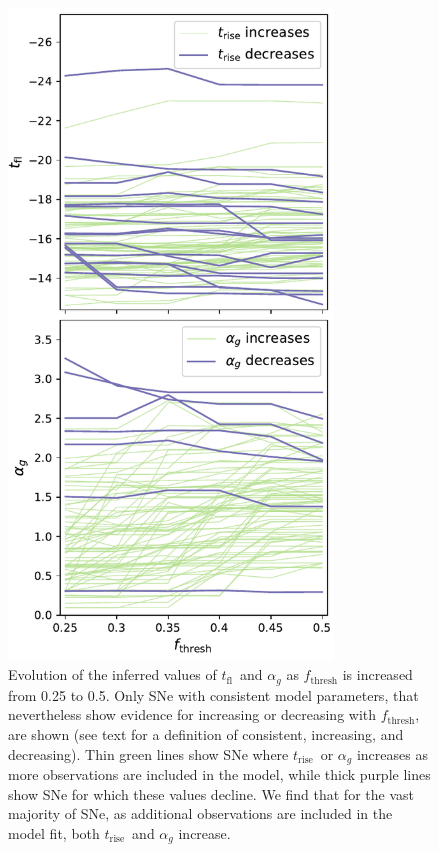\documentclass[twocolumn]{aastex63}
\newcommand{\tfl}{$t_\mathrm{fl}$}
\newcommand{\trise}{$t_\mathrm{rise}$}
\begin{document}
\begin{figure}[ht]
    \centering
    \includegraphics[width=3.4in]{./figures/flux_frac.pdf}
    \caption{Evolution of the inferred values of \tfl\ and $\alpha_g$ as
    $f_\mathrm{thresh}$ is increased from 0.25 to 0.5. Only SNe with
    consistent model parameters, that nevertheless show evidence for
    increasing or decreasing with $f_\mathrm{thresh}$, are shown (see text for
    a definition of consistent, increasing, and decreasing). Thin green lines
    show SNe where \trise\ or $\alpha_g$ increases as more observations are
    included in the model, while thick purple lines show SNe for which these
    values decline. We find that for the vast majority of SNe, as additional
    observations are included in the model fit, both \trise\ and $\alpha_g$
    increase.}
    \label{fig:flux_frac}
\end{figure}
\end{document}

